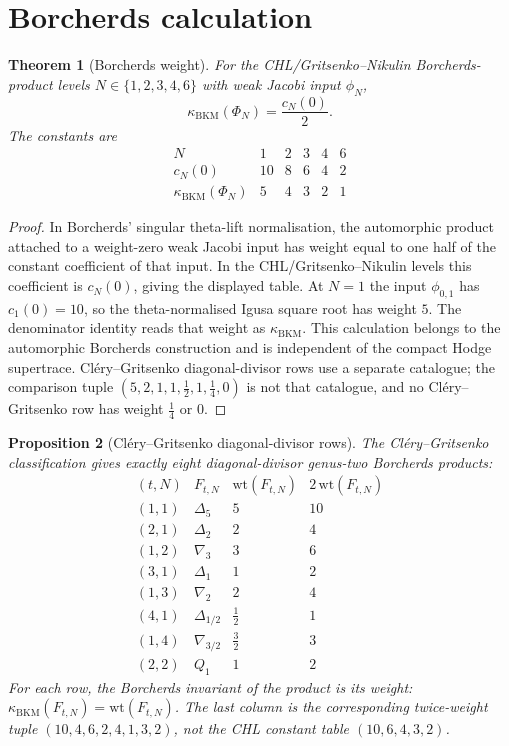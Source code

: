\documentclass[11pt]{amsart}
\newtheorem{theorem}{Theorem}
\newtheorem{proposition}[theorem]{Proposition}
\theoremstyle{definition}
\theoremstyle{remark}
\begin{document}
\section{Borcherds calculation}

\begin{theorem}[Borcherds weight]
For the CHL/Gritsenko--Nikulin Borcherds-product levels
\(N\in\{1,2,3,4,6\}\) with weak Jacobi input \(\phi_N\),
\[
        \kappa_{\mathrm{BKM}}(\Phi_N)=\frac{c_N(0)}{2}.
\]
The constants are
\[
\begin{array}{c|ccccc}
N & 1 & 2 & 3 & 4 & 6\\
\hline
c_N(0) & 10 & 8 & 6 & 4 & 2\\
\kappa_{\mathrm{BKM}}(\Phi_N) & 5 & 4 & 3 & 2 & 1
\end{array}
\]
\end{theorem}

\begin{proof}
In Borcherds' singular theta-lift normalisation, the automorphic product
attached to a weight-zero weak Jacobi input has weight equal to one half of
the constant coefficient of that input. In the CHL/Gritsenko--Nikulin
levels this coefficient is \(c_N(0)\), giving the displayed table. At
\(N=1\) the input \(\phi_{0,1}\) has \(c_1(0)=10\), so the theta-normalised
Igusa square root has weight \(5\). The denominator identity reads that
weight as \(\kappa_{\mathrm{BKM}}\). This calculation belongs to the
automorphic Borcherds construction and is independent of the compact Hodge
supertrace. Cl\'ery--Gritsenko diagonal-divisor rows use a separate catalogue;
the comparison tuple \((5,2,1,1,\frac12,1,\frac14,0)\) is not that
catalogue, and no Cl\'ery--Gritsenko row has weight \(\frac14\) or \(0\).
\end{proof}

\begin{proposition}[Cl\'ery--Gritsenko diagonal-divisor rows]
The Cl\'ery--Gritsenko classification gives exactly eight diagonal-divisor
genus-two Borcherds products:
\[
\begin{array}{c|c|c|c}
(t,N) & F_{t,N} & \mathrm{wt}(F_{t,N}) & 2\,\mathrm{wt}(F_{t,N})\\
\hline
(1,1) & \Delta_5 & 5 & 10\\
(2,1) & \Delta_2 & 2 & 4\\
(1,2) & \nabla_3 & 3 & 6\\
(3,1) & \Delta_1 & 1 & 2\\
(1,3) & \nabla_2 & 2 & 4\\
(4,1) & \Delta_{1/2} & \frac12 & 1\\
(1,4) & \nabla_{3/2} & \frac32 & 3\\
(2,2) & Q_1 & 1 & 2
\end{array}
\]
For each row, the Borcherds invariant of the product is its weight:
\(\kappa_{\mathrm{BKM}}(F_{t,N})=\mathrm{wt}(F_{t,N})\). The last column is
the corresponding twice-weight tuple \((10,4,6,2,4,1,3,2)\), not the CHL
constant table \((10,6,4,3,2)\).
\end{proposition}
\end{document}
